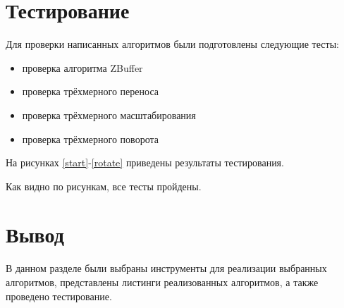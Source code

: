 \section{Тестирование}
Для проверки написанных алгоритмов были подготовлены следующие тесты:
\begin{itemize}
	\item проверка алгоритма ZBuffer
	\item проверка трёхмерного переноса
	\item проверка трёхмерного масштабирования
	\item проверка трёхмерного поворота
\end{itemize}

На рисунках \ref{start}-\ref{rotate} приведены результаты тестирования.

\newpage
Как видно по рисункам, все тесты пройдены.

\section{Вывод}
В данном разделе были выбраны инструменты для реализации выбранных алгоритмов, представлены листинги реализованных алгоритмов, а также проведено тестирование.
